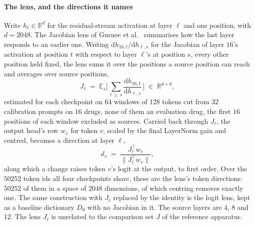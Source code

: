 \paragraph{The lens, and the directions it names} Write $h_\ell \in
\mathbb{R}^{d}$ for the residual-stream activation at layer $\ell$ and one
position, with $d = \num{2048}$. The Jacobian lens of Gurnee et
al.~\cite{workspace} summarises how the last layer responds to an earlier one.
Writing $\mathrm{d}h_{16,t}/\mathrm{d}h_{\ell,s}$ for the Jacobian of layer
$16$'s activation at position $t$ with respect to layer $\ell$'s at position $s$,
every other position held fixed, the lens sums it over the positions a source
position can reach and averages over source positions,
\begin{equation}
  J_\ell \;=\; \mathbb{E}_{s}\Big[\, \sum_{t \,\ge\, s}
    \frac{\mathrm{d}h_{16,t}}{\mathrm{d}h_{\ell,s}} \,\Big]
  \;\in\; \mathbb{R}^{d \times d},
\end{equation}
estimated for each checkpoint on $64$ windows of $128$ tokens cut from $32$
calibration prompts on $16$ drugs, none of them an evaluation drug, the first
$16$ positions of each window excluded as sources. Carried back through
$J_\ell$, the output head's row $w_v$ for token $v$, scaled by the final
LayerNorm gain and centred, becomes a direction at layer $\ell$,
\begin{equation}
  d_v \;=\; \frac{J_\ell^{\top} w_v}{\lVert J_\ell^{\top} w_v \rVert},
\end{equation}
along which a change raises token $v$'s logit at the output, to first order.
Over the $\num{50252}$ token ids all four checkpoints share, these are the
lens's token directions: $\num{50252}$ of them in a space of $\num{2048}$
dimensions, of which centring removes exactly one. The same construction with
$J_\ell$ replaced by the identity is the logit lens, kept as a baseline
dictionary $D_0$ with no Jacobian in it. The source layers are $4$, $8$ and $12$.
The lens $J_\ell$ is unrelated to the comparison set $J$ of the reference
apparatus.

